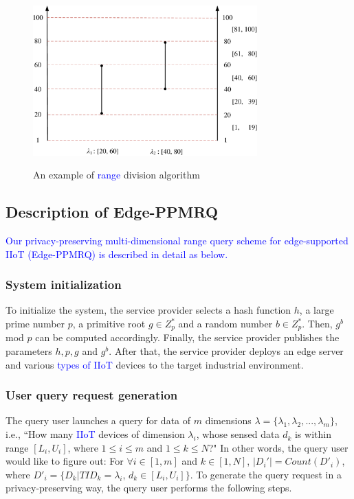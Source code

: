 \documentclass[IEEE JOURNAL OF BIOMEDICAL AND HEALTH INFORMATICS]{IEEEtran}
\begin{document}
{\begin{figure}
	\centering
	\includegraphics[width=3.4in]{ranges_division_model}\\
	\caption{An example of \textcolor{blue}{range} division algorithm}\label{sections division algorithm}
\end{figure}


\subsection{Description of Edge-PPMRQ}
 \textcolor{blue}{Our privacy-preserving multi-dimensional range query scheme for edge-supported IIoT (Edge-PPMRQ) is described in detail as below.}

\subsubsection{System initialization}
To initialize the system, the service provider selects a hash function $h$, a large prime number $p$, a primitive root $g\in Z^*_p$ and a random number $b\in Z^*_p$. Then, $g^b$ mod $p$ can be computed accordingly. Finally, the service provider publishes the parameters $h, p, g$ and $g^b$. After that, the service provider deploys an edge server and various \textcolor{blue}{types of IIoT} devices to the target industrial environment.

\subsubsection{User query request generation}
The query user launches a query for data of $m$ dimensions $\lambda =\{\lambda_1, \lambda_2, ... , \lambda_m\}$, i.e., ``How many \textcolor{blue}{IIoT} devices of dimension $\lambda_i$, whose sensed data $d_k$ is within range $[L_i, U_i]$, where $1 \le i \le m$ and $1 \le k \le N$?"  In other words, the query user would like to figure out: For $\forall i \in [1, m]$ and $ k \in [1, N]$, $|D_i'|=Count(D'_i)$, where $D'_i=\{D_k | TID_k=\lambda_i$, $d_k \in [L_i, U_i]\}$. To generate the query request in a privacy-preserving way, the query user performs the following steps.

}
\end{document}
